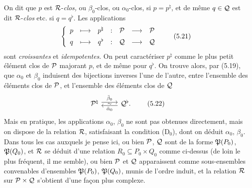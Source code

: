 On dit que $p$ est $\mathcal{R}$-\textit{clos,} ou $\beta_0$-clos, ou $\alpha_0$-clos, si $p = p^{\natural}$, et de même $q \in \mathcal{Q}$ est dit $\mathcal{R}$-\textit{clos} etc. si $q = q^{\flat}$. Les applications
\[
\left\{
\begin{array}{ccccccc}
p & \longmapsto & p^{\natural} & : & \cP & \longrightarrow & \cP\\[1ex]
q & \longmapsto & q^{\flat} & : & \cQ & \longrightarrow & \cQ
\end{array}
\right.
\tag*{(5.21)}
\]
sont \textit{croissantes} et \textit{idempotentes.} On peut caractériser $p^{\natural}$ comme le plus petit élément clos de $\mathcal{P}$ majorant $p$, et de même pour $q^{\flat}$. On trouve alors, par (5.19), que $\alpha_0$ et $\beta_0$ induisent des bijections inverses l'une de l'autre,
entre l'ensemble des éléments clos de $\mathcal{P}$, et l'ensemble des éléments clos de $\mathcal{Q}$
\[
\begin{tikzcd}
\cP^{\natural} \arrow[r, shift left, "\bar{\beta}_0"] \arrow[r, phantom, "\scriptstyle\sim"] & \cQ^{\flat}. \arrow[l, shift left, "\bar{\alpha}_0"]
\end{tikzcd}
\tag*{(5.22)}
\]
Mais en pratique, les applications $\alpha_0$, $\beta_0$ ne sont pas obtenues directement, mais on dispose de la relation $\mathcal{R}$, satisfaisant la condition (D$_0$), dont on déduit $\alpha_0$, $\beta_0$. Dans tous les cas auxquels je pense ici, ou bien $\mathcal{P}$, $\mathcal{Q}$ sont de la forme $\mathfrak{P}(P_0)$, $\mathfrak{P}(Q_0)$, et $\mathcal{R}$ se déduit d'une relation $R_0 \subseteq P_0 \times Q_0$ comme ci-dessus (de loin le plus fréquent, il me semble), ou bien $\mathcal{P}$ et $\mathcal{Q}$ apparaissent comme sous-ensembles convenables d'ensembles $\mathfrak{P}(P_0)$, $\mathfrak{P}(Q_0)$, munis de l'ordre induit, et la relation $\mathcal{R}$ sur $\mathcal{P} \times \mathcal{Q}$ s'obtient d'une façon plus complexe.

